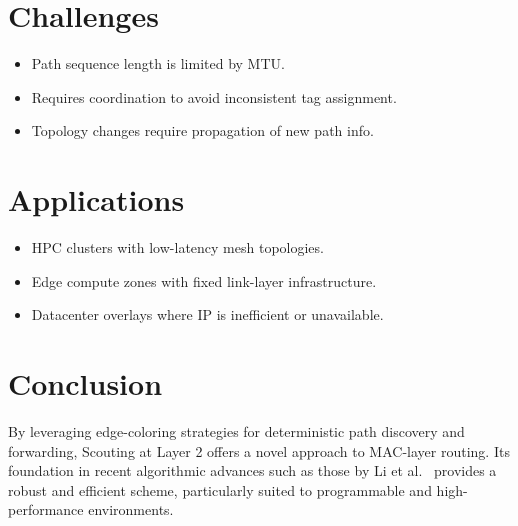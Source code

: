 \documentclass[../OAE-SPEC-MAIN.tex]{subfiles}
\begin{document}
\section{Challenges}

\begin{itemize}
    \item Path sequence length is limited by MTU.
    \item Requires coordination to avoid inconsistent tag assignment.
    \item Topology changes require propagation of new path info.
\end{itemize}

\section{Applications}

\begin{itemize}
    \item HPC clusters with low-latency mesh topologies.
    \item Edge compute zones with fixed link-layer infrastructure.
    \item Datacenter overlays where IP is inefficient or unavailable.
\end{itemize}

\section{Conclusion}

By leveraging edge-coloring strategies for deterministic path discovery and forwarding, Scouting at Layer 2 offers a novel approach to MAC-layer routing. Its foundation in recent algorithmic advances such as those by Li et al.~\cite{li2024vizing} provides a robust and efficient scheme, particularly suited to programmable and high-performance environments.
\end{document}

